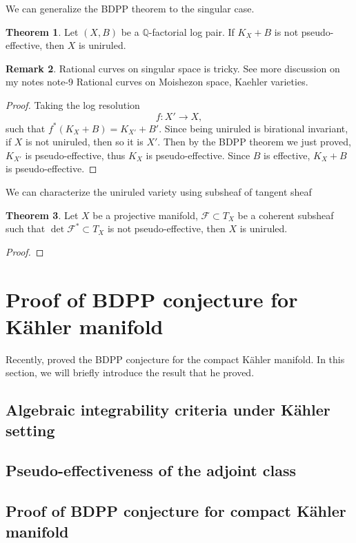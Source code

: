 \documentclass[11pt]{article}
\theoremstyle{definition}
\newtheorem{theorem}{Theorem}
\newtheorem{remark}[theorem]{Remark}
\begin{document}
	We can generalize the BDPP theorem to the singular case.
	\begin{theorem}
		Let $(X,B)$ be a $\mathbb{Q}$-factorial log pair. If $K_X+B$ is not pseudo-effective, then $X$ is uniruled.
	\end{theorem}
	\begin{remark}
		Rational curves on singular space is tricky. See more discussion on my notes note-9 Rational curves on Moishezon space, Kaehler varieties.
	\end{remark}
	\begin{proof}
		Taking the log resolution $$f:X'\to X, $$such that $f^*(K_X+B) =  K_{X'}+B'$. Since being uniruled is birational invariant, if $X$ is not uniruled, then so it is $X'$. Then by the BDPP theorem we just proved, $K_{X'}$ is pseudo-effective, thus $K_X$ is pseudo-effective. Since $B$ is effective, $K_X+B$ is pseudo-effective. 
	\end{proof}
	We can characterize the uniruled variety using subsheaf of tangent sheaf
	\begin{theorem}
		Let $X$ be a projective manifold, $\mathscr{F}\subset T_X$ be a coherent subsheaf such that $\det{\mathscr{F}^*}\subset T_X$ is not pseudo-effective, then $X$ is uniruled.
	\end{theorem}
	\begin{proof}
		
	\end{proof}
	
	\section{Proof of BDPP conjecture for K\"ahler manifold}
	Recently, \cite{Ou} proved the BDPP conjecture for the compact K\"ahler manifold. In this section, we will briefly introduce the result that he proved.
	
	\subsection{Algebraic integrability criteria under K\"ahler setting}
	
	\subsection{Pseudo-effectiveness of the adjoint class}
	\subsection{Proof of BDPP conjecture for compact K\"ahler manifold}
	
\end{document}
